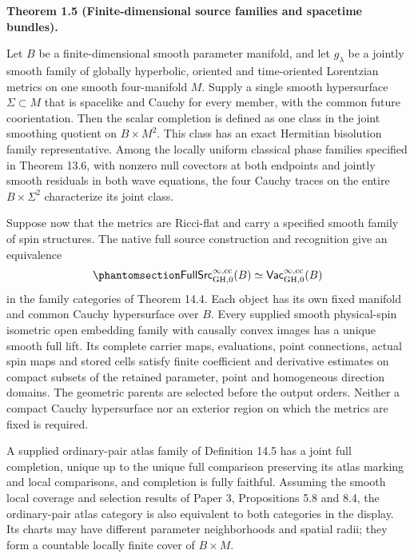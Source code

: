 \documentclass[
  english,
  11pt,
  reqno]{amsart}
\makeatletter
\newcommand{\pandocstatementheading}[1]{%
  \par\if@nobreak\else
    \addpenalty{\@beginparpenalty}%
    \addvspace{.5\baselineskip plus .2\baselineskip minus .2\baselineskip}%
  \fi
  {\normalfont\bfseries #1\par}%
  \nobreak\@afterindenttrue\@afterheading
}
\makeatother
\begin{document}
\pandocstatementheading{\protect{}\label{thm:global-family-correspondence-overview}Theorem 1.5 (Finite-dimensional source families and spacetime bundles).}

Let \(B\) be a finite-dimensional smooth parameter manifold, and let
\(g_\lambda\) be a jointly smooth family of globally hyperbolic,
oriented and time-oriented Lorentzian metrics on one smooth
four-manifold \(M\). Supply a single smooth hypersurface
\(\Sigma\subset M\) that is spacelike and Cauchy for every member, with
the common future coorientation. Then the scalar completion is defined
as one class in the joint smoothing quotient on \(B\times M^2\). This
class has an exact Hermitian bisolution family representative. Among the
locally uniform classical phase families specified in Theorem 13.6, with
nonzero null covectors at both endpoints and jointly smooth residuals in
both wave equations, the four Cauchy traces on the entire
\(B\times\Sigma^2\) characterize its joint class.

Suppose now that the metrics are Ricci-flat and carry a specified smooth
family of spin structures. The native full source construction and
recognition give an equivalence
\begin{equation}\protect\phantomsection\label{eq:global-family-correspondence-overview}{
\mathsf{FullSrc}^{\infty,\mathrm{cc}}_{\mathrm{GH},0}(B)
\simeq
\mathsf{Vac}^{\infty,\mathrm{cc}}_{\mathrm{GH},0}(B)
}\end{equation} in the family categories of Theorem 14.4. Each object
has its own fixed manifold and common Cauchy hypersurface over \(B\).
Every supplied smooth physical-spin isometric open embedding family with
causally convex images has a unique smooth full lift. Its complete
carrier maps, evaluations, point connections, actual spin maps and
stored cells satisfy finite coefficient and derivative estimates on
compact subsets of the retained parameter, point and homogeneous
direction domains. The geometric parents are selected before the output
orders. Neither a compact Cauchy hypersurface nor an exterior region on
which the metrics are fixed is required.

A supplied ordinary-pair atlas family of Definition 14.5 has a joint
full completion, unique up to the unique full comparison preserving its
atlas marking and local comparisons, and completion is fully faithful.
Assuming the smooth local coverage and selection results of Paper 3,
Propositions 5.8 and 8.4, the ordinary-pair atlas category is also
equivalent to both categories in the display. Its charts may have
different parameter neighborhoods and spatial radii; they form a
countable locally finite cover of \(B\times M\).
\end{document}
